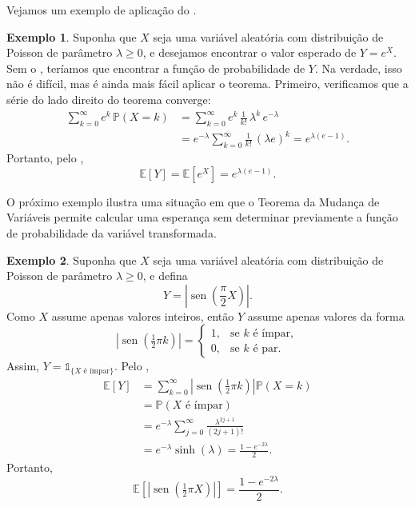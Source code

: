 \documentclass[12pt,portuguese]{article}
\theoremstyle{definition}
\newtheorem{example}[example]{Exemplo}
\renewcommand{\sin}{\operatorname{sen}}
\begin{document}
Vejamos um exemplo de aplicação do .

\begin{example}\label{ex:poisson-exponencial}
Suponha que \(X\) seja uma variável aleatória com distribuição de Poisson de
parâmetro \(\lambda\geqslant 0\), e desejamos encontrar o valor esperado de
\(Y = e^X\). Sem o , teríamos que encontrar a função de
probabilidade de \(Y\). Na verdade, isso não é difícil, mas é ainda mais fácil
aplicar o teorema. Primeiro, verificamos que a série do lado direito do teorema
converge:
\[
\begin{aligned}
\sum_{k=0}^{\infty} e^k \, \mathbb{P}(X = k)
&= \sum_{k=0}^{\infty} e^k \, \frac{1}{k!} \, \lambda^k \, e^{-\lambda} \\
&= e^{-\lambda} \sum_{k=0}^{\infty} \frac{1}{k!} \, (\lambda e)^k
= e^{\lambda(e - 1)}.
\end{aligned}
\]
Portanto, pelo ,
\[
\mathbb{E}[Y] = \mathbb{E}[e^X] = e^{\lambda(e-1)}.
\]
\end{example}

O próximo exemplo ilustra uma situação em que o Teorema da Mudança de
Variáveis permite calcular uma esperança sem determinar previamente a
função de probabilidade da variável transformada.

\begin{example}
\label{ex:poisson-seno-esperanca}
Suponha que $X$ seja uma variável aleatória com distribuição de Poisson de parâmetro
\(\lambda\geqslant 0\), e defina
\[
Y = \left|\sin\left(\frac{\pi}{2} X\right)\right|.
\]
Como \(X\) assume apenas valores inteiros, então $Y$ assume apenas valores da forma 
\[
\left|\sin\left(\tfrac{1}{2}\pi k\right)\right|
=
\begin{cases}
1, & \text{se } k \text{ é ímpar},\\
0, & \text{se } k \text{ é par}.
\end{cases}
\]
Assim, \(Y=\mathds{1}_{\{X\text{ é ímpar}\}}\). Pelo
,
\begin{align*}
\mathbb{E}[Y]
&= \sum_{k=0}^{\infty}
\left|\sin\left(\tfrac{1}{2}\pi k\right)\right|
\mathbb{P}(X=k)\\[0.2cm]
&= \mathbb{P}(X\text{ é ímpar})\\[0.2cm]
&= e^{-\lambda}\sum_{j=0}^{\infty}
\frac{\lambda^{2j+1}}{(2j+1)!}\\[0.2cm]
&= e^{-\lambda}\sinh(\lambda)
= \frac{1-e^{-2\lambda}}{2}.
\end{align*}
Portanto,
\[
\mathbb{E}\!\left[\left|\sin\left(\tfrac{1}{2}\pi X\right)\right|\right]
= \frac{1-e^{-2\lambda}}{2}.
\]
\end{example}
\end{document}
